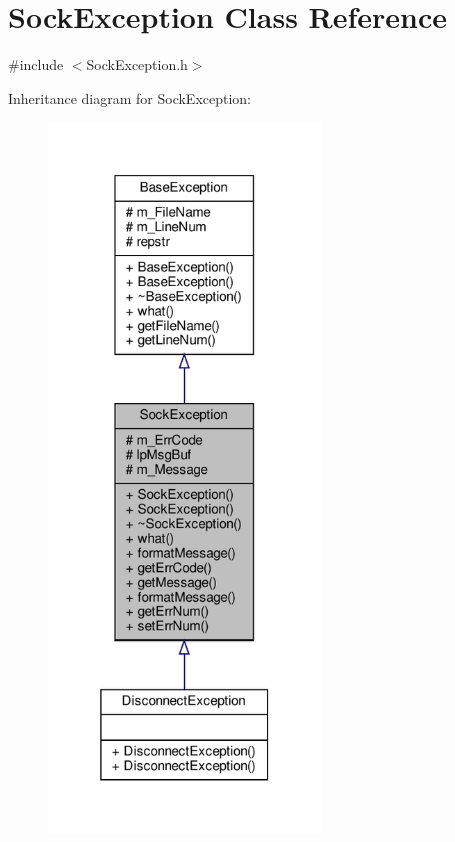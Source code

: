 \hypertarget{classSockException}{}\section{Sock\+Exception Class Reference}
\label{classSockException}


{\ttfamily \#include $<$Sock\+Exception.\+h$>$}



Inheritance diagram for Sock\+Exception\+:\nopagebreak
\begin{figure}[H]
\begin{center}
\leavevmode
\includegraphics[width=205pt]{classSockException__inherit__graph}
\end{center}
\end{figure}
